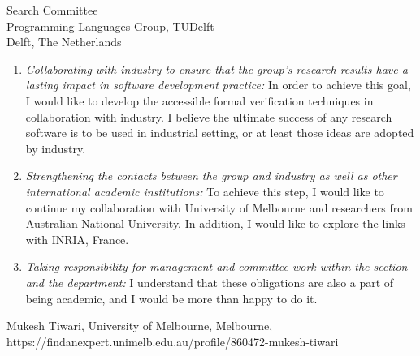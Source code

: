 \documentclass{letter}
\begin{document}
\begin{letter}{Search Committee\\
Programming Languages Group, TUDelft\\
Delft, The Netherlands}
\begin{enumerate}
\item \textit{Collaborating with industry to ensure that the group’s research results have a lasting impact in software development practice:}
   In order to achieve this goal, I would like to develop the  accessible formal verification techniques in collaboration with industry. I believe 
   the ultimate success of any research software is to be used in industrial setting, or at least those ideas are  adopted by industry. 

\item \textit{Strengthening the contacts between the group and industry as well as other international academic institutions:} 
  To achieve this step, I would like to continue my collaboration with University of Melbourne and researchers from Australian National University. 
  In addition, I would like to explore the links with INRIA, France.     

\item \textit{Taking responsibility for management and committee work within the section and the department:} 
  I understand that these obligations are also a part of being academic, and I would be more than happy to do it.
  	
\end{enumerate} 




Mukesh Tiwari,
University of Melbourne, Melbourne, https://findanexpert.unimelb.edu.au/profile/860472-mukesh-tiwari\\

\end{letter}
\end{document}

